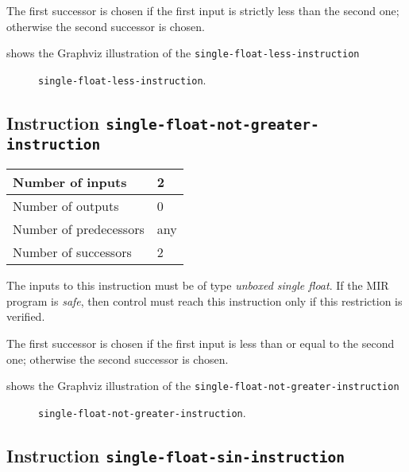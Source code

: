 The first successor is chosen if the first input is strictly less than
the second one; otherwise the second successor is chosen. 

 shows the Graphviz illustration of the
\texttt{single-float-less-instruction}

\begin{figure}
\begin{center}
\end{center}
\caption{\label{fig-single-float-less-instruction}
\texttt{single-float-less-instruction}.}
\end{figure}

\subsection{Instruction \texttt{single-float-not-greater-instruction}}
\label{mir-instruction-single-float-not-greater}

\begin{tabular}{|l|l|}
\hline
Number of inputs & 2\\
\hline
Number of outputs & 0\\
\hline
Number of predecessors & any\\
\hline
Number of successors & 2\\
\hline
\end{tabular}

The inputs to this instruction must be of type \emph{unboxed single
  float}.  If the MIR program is \emph{safe}, then control must reach
this instruction only if this restriction is verified.

The first successor is chosen if the first input is less than or equal
to the second one; otherwise the second successor is chosen.

 shows the Graphviz illustration of the
\texttt{single-float-not-greater-instruction}

\begin{figure}
\begin{center}
\end{center}
\caption{\label{fig-single-float-not-greater-instruction}
\texttt{single-float-not-greater-instruction}.}
\end{figure}

\subsection{Instruction \texttt{single-float-sin-instruction}}
\label{mir-instruction-single-float-div}

